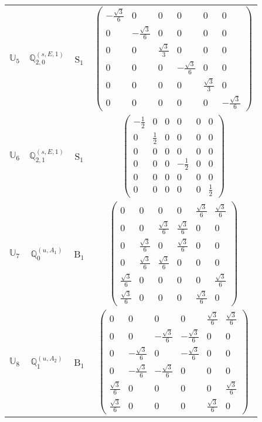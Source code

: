 \documentclass[fleqn,10pt,landscape]{article}
\begin{document}
\begin{itemize}
\begin{center}
\begin{longtable}{c|c|c|c}
$ \mathbb{U}_{5} $ & $\mathbb{Q}_{2,0}^{(s,E,1)}$ & S$_{1}$ & $\begin{pmatrix} - \frac{\sqrt{3}}{6} & 0 & 0 & 0 & 0 & 0 \\ 0 & - \frac{\sqrt{3}}{6} & 0 & 0 & 0 & 0 \\ 0 & 0 & \frac{\sqrt{3}}{3} & 0 & 0 & 0 \\ 0 & 0 & 0 & - \frac{\sqrt{3}}{6} & 0 & 0 \\ 0 & 0 & 0 & 0 & \frac{\sqrt{3}}{3} & 0 \\ 0 & 0 & 0 & 0 & 0 & - \frac{\sqrt{3}}{6} \end{pmatrix}$ \\
$ \mathbb{U}_{6} $ & $\mathbb{Q}_{2,1}^{(s,E,1)}$ & S$_{1}$ & $\begin{pmatrix} - \frac{1}{2} & 0 & 0 & 0 & 0 & 0 \\ 0 & \frac{1}{2} & 0 & 0 & 0 & 0 \\ 0 & 0 & 0 & 0 & 0 & 0 \\ 0 & 0 & 0 & - \frac{1}{2} & 0 & 0 \\ 0 & 0 & 0 & 0 & 0 & 0 \\ 0 & 0 & 0 & 0 & 0 & \frac{1}{2} \end{pmatrix}$ \\ \hline
$ \mathbb{U}_{7} $ & $\mathbb{Q}_{0}^{(u,A_{1})}$ & B$_{1}$ & $\begin{pmatrix} 0 & 0 & 0 & 0 & \frac{\sqrt{3}}{6} & \frac{\sqrt{3}}{6} \\ 0 & 0 & \frac{\sqrt{3}}{6} & \frac{\sqrt{3}}{6} & 0 & 0 \\ 0 & \frac{\sqrt{3}}{6} & 0 & \frac{\sqrt{3}}{6} & 0 & 0 \\ 0 & \frac{\sqrt{3}}{6} & \frac{\sqrt{3}}{6} & 0 & 0 & 0 \\ \frac{\sqrt{3}}{6} & 0 & 0 & 0 & 0 & \frac{\sqrt{3}}{6} \\ \frac{\sqrt{3}}{6} & 0 & 0 & 0 & \frac{\sqrt{3}}{6} & 0 \end{pmatrix}$ \\
$ \mathbb{U}_{8} $ & $\mathbb{Q}_{1}^{(u,A_{2})}$ & B$_{1}$ & $\begin{pmatrix} 0 & 0 & 0 & 0 & \frac{\sqrt{3}}{6} & \frac{\sqrt{3}}{6} \\ 0 & 0 & - \frac{\sqrt{3}}{6} & - \frac{\sqrt{3}}{6} & 0 & 0 \\ 0 & - \frac{\sqrt{3}}{6} & 0 & - \frac{\sqrt{3}}{6} & 0 & 0 \\ 0 & - \frac{\sqrt{3}}{6} & - \frac{\sqrt{3}}{6} & 0 & 0 & 0 \\ \frac{\sqrt{3}}{6} & 0 & 0 & 0 & 0 & \frac{\sqrt{3}}{6} \\ \frac{\sqrt{3}}{6} & 0 & 0 & 0 & \frac{\sqrt{3}}{6} & 0 \end{pmatrix}$ \\

\end{longtable}
\end{center}
\end{itemize}
\end{document}
